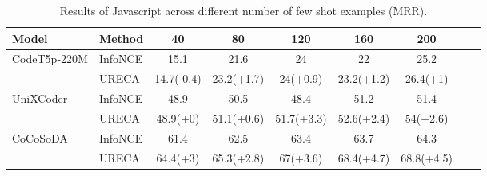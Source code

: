 \begin{table}[h]
\def\arraystretch{1.0}
\setlength\tabcolsep{8pt} %
\begin{tabular}{@{}lllcccccc@{}}

\toprule
Model                            & \multicolumn{1}{l}{Method}              & \multicolumn{1}{c}{40}           
& \multicolumn{1}{c}{80}         & \multicolumn{1}{c}{120}                 & \multicolumn{1}{c}{160}     
& \multicolumn{1}{c}{200}        \\ \midrule

\multirow{2}{*}{CodeT5p-220M}      
& InfoNCE                   & \multicolumn{1}{c}{15.1}          & \multicolumn{1}{c}{21.6}          
                            & \multicolumn{1}{c}{24}          & \multicolumn{1}{c}{22}          
                            & \multicolumn{1}{c}{25.2}                   
                            \\ \cmidrule(l){2-7} 
& URECA                     & \multicolumn{1}{c}{14.7(-0.4)}          & \multicolumn{1}{c}{23.2(+1.7)}          
                            & \multicolumn{1}{c}{24(+0.9)}          & \multicolumn{1}{c}{23.2(+1.2)}          
                            & \multicolumn{1}{c}{26.4(+1)}                  
                            \\ \midrule

\multirow{2}{*}{UniXCoder} 
& InfoNCE                   & \multicolumn{1}{c}{48.9}              & \multicolumn{1}{c}{50.5}          
                            & \multicolumn{1}{c}{48.4}              & \multicolumn{1}{c}{51.2}          
                            & \multicolumn{1}{c}{51.4}                  
                            \\ \cmidrule(l){2-7} 
& URECA                     & \multicolumn{1}{c}{48.9(+0)}          & \multicolumn{1}{c}{51.1(+0.6)}          
                            & \multicolumn{1}{c}{51.7(+3.3)}          & \multicolumn{1}{c}{52.6(+2.4)}          
                            & \multicolumn{1}{c}{54(+2.6)}                   
                            \\ \midrule

\multirow{2}{*}{CoCoSoDA} 
& InfoNCE                   & \multicolumn{1}{c}{61.4}              & \multicolumn{1}{c}{62.5}          
                            & \multicolumn{1}{c}{63.4}              & \multicolumn{1}{c}{63.7}          
                            & \multicolumn{1}{c}{64.3}                    
                            \\ \cmidrule(l){2-7} 
& URECA                     & \multicolumn{1}{c}{64.4(+3)}          & \multicolumn{1}{c}{65.3(+2.8)}          
                            & \multicolumn{1}{c}{67(+3.6)}          & \multicolumn{1}{c}{68.4(+4.7)}          
                            & \multicolumn{1}{c}{68.8(+4.5)}                   
                            \\ \bottomrule 
\end{tabular}
\caption{Results of Javascript across different number of few shot examples (MRR).}
\label{CSN_Javascript}
\end{table}


